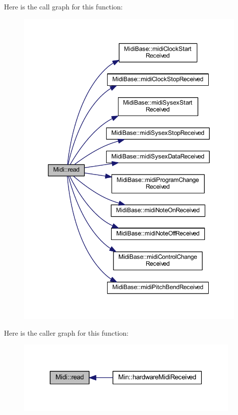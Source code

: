 Here is the call graph for this function\+:
\nopagebreak
\begin{figure}[H]
\begin{center}
\leavevmode
\includegraphics[width=343pt]{class_midi_a6003d2a28da28e44143e494faf16acd9_cgraph}
\end{center}
\end{figure}
Here is the caller graph for this function\+:
\nopagebreak
\begin{figure}[H]
\begin{center}
\leavevmode
\includegraphics[width=309pt]{class_midi_a6003d2a28da28e44143e494faf16acd9_icgraph}
\end{center}
\end{figure}
\mbox{\label{class_midi_a2b55e3e055e1076a4113374ec3c06056}} 
